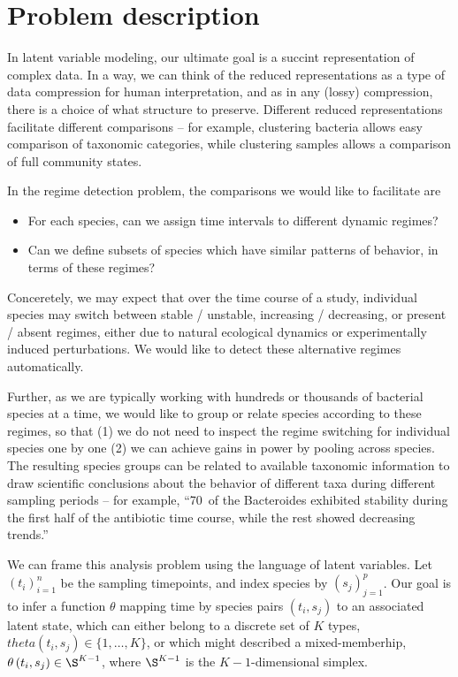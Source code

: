 \documentclass{article}
\begin{document}
\section{Problem description}
\label{sec:problem_description}

In latent variable modeling, our ultimate goal is a succint representation of
complex data. In a way, we can think of the reduced representations as a type of
data compression for human interpretation, and as in any (lossy) compression,
there is a choice of what structure to preserve. Different reduced
representations facilitate different comparisons -- for example, clustering
bacteria allows easy comparison of taxonomic categories, while clustering
samples allows a comparison of full community states.

In the regime detection problem, the comparisons we would like to facilitate are
\begin{itemize}
\item For each species, can we assign time intervals to different dynamic
  regimes?
\item Can we define subsets of species which have similar patterns of behavior,
  in terms of these regimes?
\end{itemize}

Conceretely, we may expect that over the time course of a study, individual
species may switch between stable / unstable, increasing / decreasing, or
present / absent regimes, either due to natural ecological dynamics or
experimentally induced perturbations. We would like to detect these alternative
regimes automatically.

Further, as we are typically working with hundreds or thousands of bacterial
species at a time, we would like to group or relate species according to these
regimes, so that (1) we do not need to inspect the regime switching for
individual species one by one (2) we can achieve gains in power by pooling
across species. The resulting species groups can be related to available taxonomic
information to draw scientific conclusions about the behavior of different
taxa during different sampling periods -- for example, ``70\ of the Bacteroides
exhibited stability during the first half of the antibiotic time course, while
the rest showed decreasing trends.''

We can frame this analysis problem using the language of latent variables. Let
$\left(t_{i}\right)_{i = 1}^{n}$ be the sampling timepoints, and index species by
$\left(s_{j}\right)_{j = 1}^{p}$. Our goal is to infer a function $\theta$
mapping time by species pairs $\left(t_{i}, s_{j}\right)$ to an associated
latent state, which can either belong to a discrete set of $K$ types,
$theta\left(t_{i}, s_{j}\right) \in \{1, \dots, K\}$, or which might described a
mixed-memberhip, $\theta\left(t_{i}, s_{j}\right) \in \S^{K - 1}$, where
$\S^{K - 1}$ is the $K - 1$-dimensional simplex.
\end{document}
